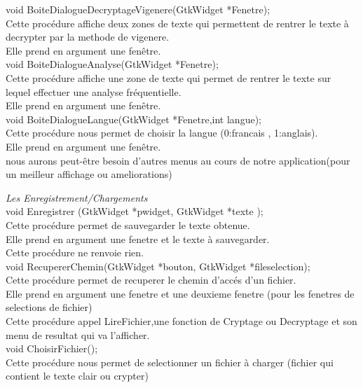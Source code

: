 \documentclass[a4]{article}
\begin{document}
	void BoiteDialogueDecryptageVigenere(GtkWidget *Fenetre);\\
		Cette procédure affiche deux zones de texte qui permettent de rentrer le texte à decrypter par la methode de vigenere.\\
		Elle prend en argument une fenêtre.\\
		
	void BoiteDialogueAnalyse(GtkWidget *Fenetre);\\
		Cette procédure affiche une zone de texte qui permet de rentrer le texte sur lequel effectuer une analyse fréquentielle.\\
		Elle prend en argument une fenêtre.\\
		
	void BoiteDialogueLangue(GtkWidget *Fenetre,int langue);\\
		Cette procédure nous permet de choisir la langue (0:francais , 1:anglais).\\
		Elle prend en argument une fenêtre.\\
		
	nous aurons peut-être besoin d'autres menus au cours de notre application(pour un meilleur affichage ou ameliorations) 
	
	\textit{Les Enregistrement/Chargements}\\
	
	void Enregistrer (GtkWidget *pwidget, GtkWidget *texte );\\
		Cette procédure permet de sauvegarder le texte obtenue.\\
		Elle prend en argument une fenetre et le texte à sauvegarder.\\
		Cette procédure ne renvoie rien.\\
	
	void RecupererChemin(GtkWidget *bouton, GtkWidget *fileselection);\\
		Cette procédure permet de recuperer le chemin d'accés d'un fichier.\\
		Elle prend en argument une fenetre et une deuxieme fenetre (pour les fenetres de selections de fichier)\\
		Cette procédure appel LireFichier,une fonction de Cryptage ou Decryptage et son menu de resultat qui va l'afficher.\\
		

	void ChoisirFichier();\\
		Cette procédure nous permet de selectionner un fichier à charger (fichier qui contient le texte clair ou 		crypter)\\
\end{document}
